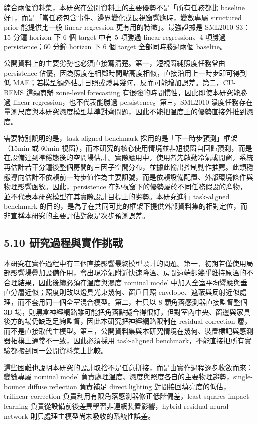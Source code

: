 \documentclass[12pt,a4paper]{article}
\begin{document}
綜合兩個資料集，本研究在公開資料上的主要優勢不是「所有任務都比 baseline 好」，而是「當任務包含事件、邊界變化或長視窗響應時，變數專屬 structured prior 能提供比一般 linear regression 更有用的特徵」。最強證據是 SML2010 S3：15 分鐘 horizon 下 6 個 target 中有 5 項勝過 linear regression、4 項勝過 persistence；60 分鐘 horizon 下 6 個 target 全部同時勝過兩個 baseline。


公開資料上的主要劣勢也必須直接寫清楚。第一，短視窗純照度任務常由 persistence 佔優，因為照度在相鄰時間點高度相似，直接沿用上一時步即可得到低 MAE；若模型額外估計日照或燈具幾何，反而可能增加誤差。第二，CU-BEMS 這類商辦 zone-level forecasting 有很強的時間慣性，因此即使本研究能勝過 linear regression，也不代表能勝過 persistence。第三，SML2010 濕度任務存在量測尺度與本研究濕度模型基準對齊問題，因此不能把溫度上的優勢直接外推到濕度。


需要特別說明的是，task-aligned benchmark 採用的是「下一時步預測」框架（15min 或 60min 視窗），而本研究的核心使用情境並非短視窗自回歸預測，而是在設備達到準穩態後的空間場估計。實際應用中，使用者先啟動冷氣或開窗，系統再估計若干分鐘後整個房間的三因子空間分布，並據此輸出控制動作推薦。此類穩態導向估計不依賴前一時步值作為主要訊號，而是依賴設備配置、外部環境條件與物理影響函數。因此，persistence 在短視窗下的優勢屬於不同任務假設的產物，並不代表本研究模型在其實際設計目標上的劣勢。本研究進行 task-aligned benchmark 的目的，是為了在共同可比的框架下提供外部資料集的相對定位，而非宣稱本研究的主要評估對象是次步預測誤差。


\subsection*{5.10 研究過程與實作挑戰}

本研究在實作過程中有三個直接影響最終模型設計的問題。第一，初期若僅使用局部影響場疊加設備作用，會出現冷氣附近快速降溫、房間遠端卻幾乎維持原溫的不合理結果，因此後續必須在溫度與濕度 nominal model 中加入全室平均響應與垂直分層近似；照度則改以燈具光束幾何、窗戶日照 envelope、遮蔽與反射近似處理，而不套用同一個全室混合模型。第二，若只以 8 顆角落感測器直接監督整個 3D 場，則黑盒神經網路雖可能把角落點擬合得很好，但對室內中央、窗邊與家具後方的場仍缺乏足夠監督，因此本研究把神經網路限制在 residual correction 層，而不是直接取代主模型。第三，公開資料集與本研究情境在幾何、裝置標記與感測器拓樸上通常不一致，因此必須採用 task-aligned benchmark，不能直接把所有實驗都搬到同一公開資料集上比較。


這些困難也說明本研究的設計取捨不是任意拼接，而是由實作過程逐步收斂而來：變數專屬 nominal model 負責處理溫度、濕度與照度各自的主要物理趨勢，single-bounce diffuse reflection 負責補足 direct lighting 對間接回填亮度的低估，trilinear correction 負責利用有限角落感測器修正低階偏差，least-squares impact learning 負責從設備前後差異學習非連網裝置影響，hybrid residual neural network 則只處理主模型尚未吸收的系統性誤差。
\end{document}
